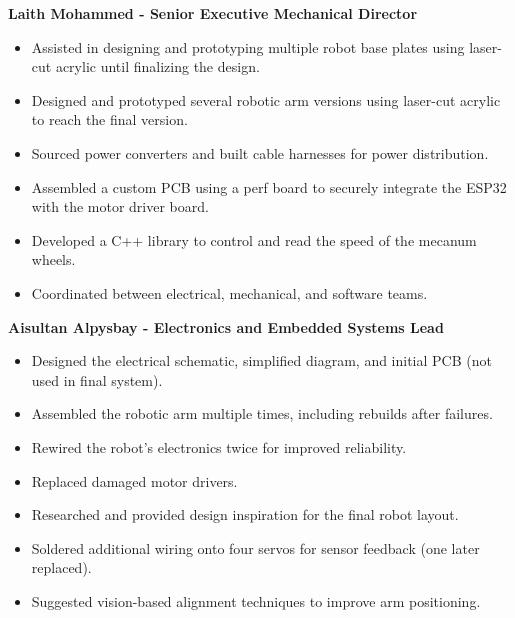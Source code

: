 \documentclass{article}
\begin{document}
\textbf{Laith Mohammed - Senior Executive Mechanical Director}


\begin{itemize}
\footnotesize

\item Assisted in designing and prototyping multiple robot base plates using laser-cut acrylic until finalizing the design.
    
\item Designed and prototyped several robotic arm versions using laser-cut acrylic to reach the final version.
    
\item Sourced power converters and built cable harnesses for power distribution.
    
\item Assembled a custom PCB using a perf board to securely integrate the ESP32 with the motor driver board.
    
\item Developed a C++ library to control and read the speed of the mecanum wheels.
    
\item Coordinated between electrical, mechanical, and software teams.
\end{itemize}

\textbf{Aisultan Alpysbay - Electronics and Embedded Systems Lead}

\begin{itemize}
\footnotesize

\item Designed the electrical schematic, simplified diagram, and initial PCB (not used in final system).
    
\item Assembled the robotic arm multiple times, including rebuilds after failures.
    
\item Rewired the robot's electronics twice for improved reliability.
    
\item Replaced damaged motor drivers.
    
\item Researched and provided design inspiration for the final robot layout.
    
\item Soldered additional wiring onto four servos for sensor feedback (one later replaced).
    
\item Suggested vision-based alignment techniques to improve arm positioning.
\end{itemize}
\end{document}
